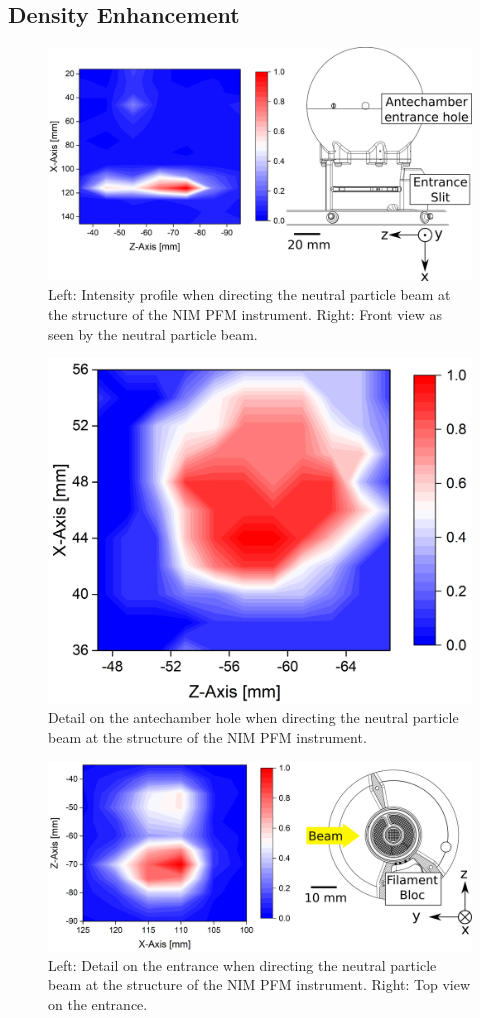 	\subsection{Density Enhancement}\label{chap:expDensEntSlit}
	\begin{figure}[h!]
		\centering
		\includegraphics[width=\textwidth]{Experiments/2D_scan_anteEntr.png}
		\caption{Left: Intensity profile when directing the neutral particle beam at the structure of the NIM PFM instrument. Right: Front view as seen by the neutral particle beam.}
		\label{exp:PFMIntCharTot}
	\end{figure}
	\begin{figure}[h!]
		\centering
		\includegraphics[width=.6\textwidth]{Experiments/2D_scan_Ant.png}
		\caption{Detail on the antechamber hole when directing the neutral particle beam at the structure of the NIM PFM instrument.}
		\label{exp:PFMIntCharAnt}
	\end{figure}	
	\begin{figure}[h!]
		\centering
		\includegraphics[width=\textwidth]{Experiments/2D_scan_Entr.png}
		\caption{Left: Detail on the entrance when directing the neutral particle beam at the structure of the NIM PFM instrument. Right: Top view on the entrance.}
		\label{exp:PFMIntCharEnt}
	\end{figure}
